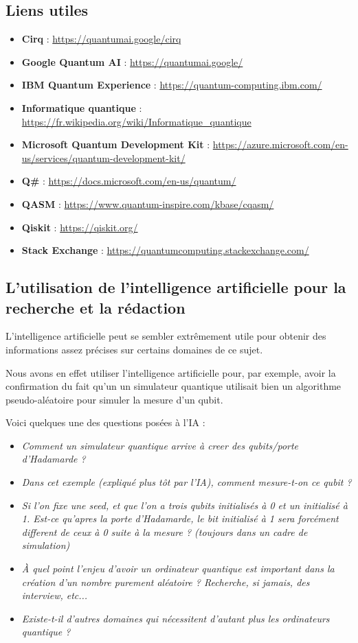 \documentclass{article}
\begin{document}
\subsection{Liens utiles}
\begin{itemize}
  \item \textbf{Cirq} : \url{https://quantumai.google/cirq}
  \item \textbf{Google Quantum AI} : \url{https://quantumai.google/}
  \item \textbf{IBM Quantum Experience} : \url{https://quantum-computing.ibm.com/}
  \item \textbf{Informatique quantique} : \url{https://fr.wikipedia.org/wiki/Informatique_quantique}
  \item \textbf{Microsoft Quantum Development Kit} : \url{https://azure.microsoft.com/en-us/services/quantum-development-kit/}
  \item \textbf{Q\#} : \url{https://docs.microsoft.com/en-us/quantum/}
  \item \textbf{QASM} : \url{https://www.quantum-inspire.com/kbase/cqasm/}
  \item \textbf{Qiskit} : \url{https://qiskit.org/}
  \item \textbf{Stack Exchange} : \url{https://quantumcomputing.stackexchange.com/}
\end{itemize}

\subsection{L'utilisation de l'intelligence artificielle pour la recherche et la rédaction}

L'intelligence artificielle peut se sembler extrêmement utile pour obtenir des informations assez précises sur certains domaines de ce sujet.

Nous avons en effet utiliser l'intelligence artificielle pour, par exemple, avoir la confirmation du fait qu'un un simulateur quantique utilisait bien un algorithme pseudo-aléatoire pour simuler la mesure d'un qubit.

Voici quelques une des questions posées à l'IA :

\begin{itemize}
  \item \textit{Comment un simulateur quantique arrive à creer des qubits/porte d'Hadamarde ?}
  \item \textit{Dans cet exemple (expliqué plus tôt par l'IA), comment mesure-t-on ce qubit ?}
  \item \textit{Si l'on fixe une seed, et que l'on a trois qubits initialisés à 0 et un initialisé à 1. Est-ce qu'apres la porte d'Hadamarde, le bit initialisé à 1 sera forcément different de ceux à 0 suite à la mesure ? (toujours dans un cadre de simulation) }
  \item \textit{À quel point l'enjeu d'avoir un ordinateur quantique est important dans la création d'un nombre purement aléatoire ? Recherche, si jamais, des interview, etc... }
  \item \textit{Existe-t-il d'autres domaines qui nécessitent d'autant plus les ordinateurs quantique ?}
\end{itemize}
\end{document}
